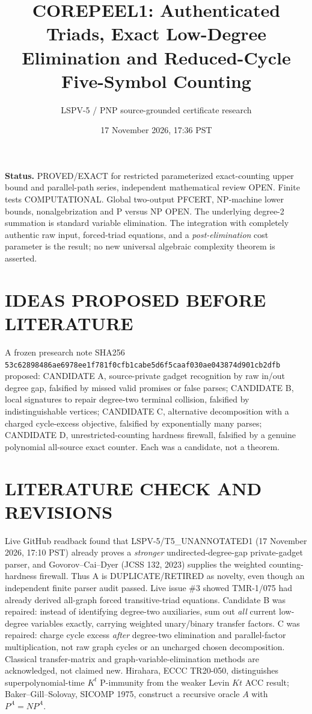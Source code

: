 \documentclass[11pt]{article}
\title{COREPEEL1: Authenticated Triads, Exact Low-Degree Elimination and Reduced-Cycle Five-Symbol Counting}
\author{LSPV-5 / PNP source-grounded certificate research}
\date{17 November 2026, 17:36 PST}
\begin{document}
\maketitle
\noindent\textbf{Status.} PROVED/EXACT for restricted parameterized exact-counting upper bound and parallel-path series, independent mathematical review OPEN. Finite tests COMPUTATIONAL. Global two-output PFCERT, NP-machine lower bounds, nonalgebrization and P versus NP OPEN. The underlying degree-2 summation is standard variable elimination. The integration with completely authentic raw input, forced-triad equations, and a \emph{post-elimination} cost parameter is the result; no new universal algebraic complexity theorem is asserted.
\section{IDEAS PROPOSED BEFORE LITERATURE}
A frozen presearch note SHA256 \texttt{53c62898486ae6978ee1f781f0cfb1cabe5d6f5caaf030ae043874d901cb2dfb} proposed: CANDIDATE A, source-private gadget recognition by raw in/out degree gap, falsified by missed valid promises or false parses; CANDIDATE B, local signatures to repair degree-two terminal collision, falsified by indistinguishable vertices; CANDIDATE C, alternative decomposition with a charged cycle-excess objective, falsified by exponentially many parses; CANDIDATE D, unrestricted-counting hardness firewall, falsified by a genuine polynomial all-source exact counter. Each was a candidate, not a theorem.
\section{LITERATURE CHECK AND REVISIONS}
Live GitHub readback found that LSPV-5/T5\_UNANNOTATED1 (17 November 2026, 17:10 PST) already proves a \emph{stronger} undirected-degree-gap private-gadget parser, and Govorov--Cai--Dyer (JCSS 132, 2023) supplies the weighted counting-hardness firewall. Thus A is DUPLICATE/RETIRED as novelty, even though an independent finite parser audit passed. Live issue \#3 showed TMR-1/075 had already derived all-graph forced transitive-triad equations. Candidate B was repaired: instead of identifying degree-two auxiliaries, sum out \emph{all} current low-degree variables exactly, carrying weighted unary/binary transfer factors. C was repaired: charge cycle excess \emph{after} degree-two elimination and parallel-factor multiplication, not raw graph cycles or an uncharged chosen decomposition. Classical transfer-matrix and graph-variable-elimination methods are acknowledged, not claimed new. Hirahara, ECCC TR20-050, distinguishes superpolynomial-time $K^t$ P-immunity from the weaker Levin $Kt$ ACC result; Baker--Gill--Solovay, SICOMP 1975, construct a recursive oracle $A$ with $P^A=NP^A$.
\end{document}
